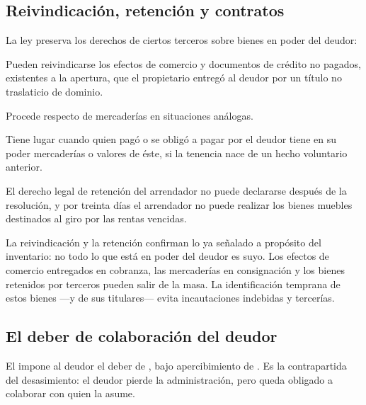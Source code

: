 \subsection{Reivindicación, retención y contratos}

La ley preserva los derechos de ciertos terceros sobre bienes en poder del deudor:

\begin{description}[leftmargin=0pt,style=nextline,font=\sffamily\bfseries]
  \item[Reivindicación de efectos de comercio (\art{151})] Pueden reivindicarse los efectos de
  comercio y documentos de crédito no pagados, existentes a la apertura, que el propietario
  entregó al deudor por un título no traslaticio de dominio.
  \item[Reivindicación de mercaderías (\art{152})] Procede respecto de mercaderías en
  situaciones análogas.
  \item[Derecho legal de retención (\art{160})] Tiene lugar cuando quien pagó o se obligó a
  pagar por el deudor tiene en su poder mercaderías o valores de éste, si la tenencia nace de un
  hecho voluntario anterior.
  \item[Arrendamiento (\art{141})] El derecho legal de retención del arrendador no puede
  declararse después de la resolución, y por treinta días el arrendador no puede realizar los
  bienes muebles destinados al giro por las rentas vencidas.
\end{description}

\begin{alerta}
La reivindicación y la retención confirman lo ya señalado a propósito del inventario: no todo lo
que está en poder del deudor es suyo. Los efectos de comercio entregados en cobranza, las
mercaderías en consignación y los bienes retenidos por terceros pueden salir de la masa. La
identificación temprana de estos bienes ---y de sus titulares--- evita incautaciones indebidas y
tercerías.
\end{alerta}

\subsection{El deber de colaboración del deudor}

El  impone al deudor el deber de , bajo apercibimiento de . Es la contrapartida del desasimiento: el deudor pierde la administración,
pero queda obligado a colaborar con quien la asume.

